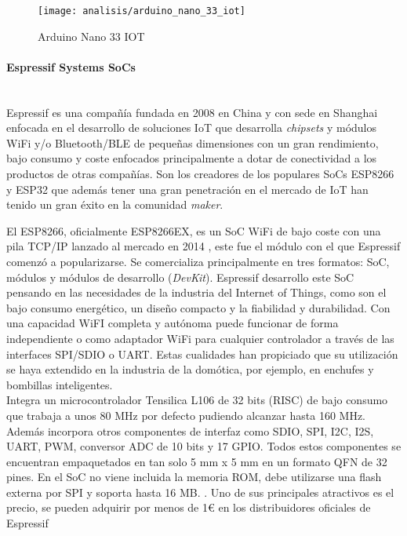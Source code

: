\documentclass[../proyecto.tex]{subfiles}
\begin{document}
\begin{figure}[H]
\centering
\texttt{[image: analisis/arduino\_nano\_33\_iot]}
\caption{Arduino Nano 33 IOT}
\label{fig:arduino_nano_33_iot}
\end{figure}

\paragraph{Espressif Systems SoCs}\mbox{}\\

Espressif es una compañía fundada en 2008 en China y con sede en Shanghai enfocada en el desarrollo de soluciones IoT que desarrolla \textit{chipsets} y módulos WiFi y/o Bluetooth/BLE de pequeñas dimensiones con un gran rendimiento, bajo consumo y coste enfocados principalmente a dotar de conectividad a los productos de otras compañías. Son los creadores de los populares SoCs ESP8266 y ESP32 que además tener una gran penetración en el mercado de IoT han tenido un gran éxito en la comunidad \textit{maker}.\\


El ESP8266, oficialmente ESP8266EX, es un SoC WiFi de bajo coste con una pila TCP/IP lanzado al mercado en 2014 \cite{esp8266_overview}, este fue el módulo con el que Espressif comenzó a popularizarse. Se comercializa principalmente en tres formatos: SoC, módulos y módulos de desarrollo (\textit{DevKit}). Espressif desarrollo este SoC pensando en las necesidades de la industria del Internet of Things, como son el bajo consumo energético, un diseño compacto y la fiabilidad y durabilidad. Con una capacidad WiFI completa y autónoma puede funcionar de forma independiente o como adaptador WiFi para cualquier controlador a través de las interfaces SPI/SDIO o UART. Estas cualidades han propiciado que su utilización se haya extendido en la industria de la domótica, por ejemplo, en enchufes y bombillas inteligentes. \\

Integra un microcontrolador Tensilica L106 de 32 bits (RISC) de bajo consumo que trabaja a unos 80 MHz por defecto pudiendo alcanzar hasta 160 MHz. Además incorpora otros componentes de interfaz como SDIO, SPI, I2C, I2S, UART, PWM, conversor ADC de 10 bits y 17 GPIO. Todos estos componentes se encuentran empaquetados en tan solo 5 mm x 5 mm en un formato QFN de 32 pines. En el SoC no viene incluida la memoria ROM, debe utilizarse una flash externa por SPI y soporta hasta 16 MB. \cite{esp8266_datasheet}. Uno de sus principales atractivos es el precio, se pueden adquirir por menos de 1€ en los distribuidores oficiales de Espressif \cite{espressif_provider_digikey} \cite{espressif_provider_mouser}\\
\end{document}

